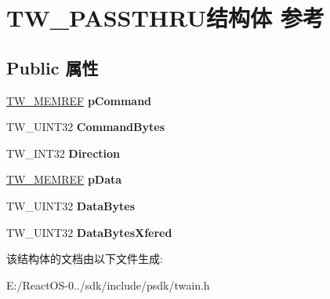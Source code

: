 \hypertarget{struct_t_w___p_a_s_s_t_h_r_u}{}\section{T\+W\+\_\+\+P\+A\+S\+S\+T\+H\+R\+U结构体 参考}
\label{struct_t_w___p_a_s_s_t_h_r_u}
\subsection*{Public 属性}
\begin{DoxyCompactItemize}
\item 
\mbox{\label{struct_t_w___p_a_s_s_t_h_r_u_a5d9861ae2c28ef08eca160938d5e9b3e}} 
\hyperlink{interfacevoid}{T\+W\+\_\+\+M\+E\+M\+R\+EF} {\bfseries p\+Command}
\item 
\mbox{\label{struct_t_w___p_a_s_s_t_h_r_u_aa1c86cfcf1d288d60128cec5d82947ae}} 
T\+W\+\_\+\+U\+I\+N\+T32 {\bfseries Command\+Bytes}
\item 
\mbox{\label{struct_t_w___p_a_s_s_t_h_r_u_a99bc4f8856cdfce3ad992661107ee5fc}} 
T\+W\+\_\+\+I\+N\+T32 {\bfseries Direction}
\item 
\mbox{\label{struct_t_w___p_a_s_s_t_h_r_u_adb6748b24eedfe40c8b86b2baf0462f8}} 
\hyperlink{interfacevoid}{T\+W\+\_\+\+M\+E\+M\+R\+EF} {\bfseries p\+Data}
\item 
\mbox{\label{struct_t_w___p_a_s_s_t_h_r_u_a51d3d8b1d7e1a5af659474bd1078a8d1}} 
T\+W\+\_\+\+U\+I\+N\+T32 {\bfseries Data\+Bytes}
\item 
\mbox{\label{struct_t_w___p_a_s_s_t_h_r_u_afcfce05f10e60ae8eefe95557e1dd8ab}} 
T\+W\+\_\+\+U\+I\+N\+T32 {\bfseries Data\+Bytes\+Xfered}
\end{DoxyCompactItemize}


该结构体的文档由以下文件生成\+:\begin{DoxyCompactItemize}
\item 
E\+:/\+React\+O\+S-\/0../sdk/include/psdk/twain.\+h\end{DoxyCompactItemize}
